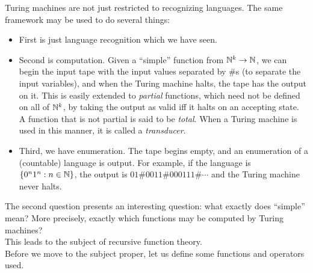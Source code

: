 	Turing machines are not just restricted to recognizing languages. The same framework may be used to do several things:
	\begin{itemize}
		\item First is just language recognition which we have seen.
		\item Second is computation. Given a ``simple'' function from $\mathbb{N}^k \to \mathbb{N}$, we can begin the input tape with the input values separated by $\#$s (to separate the input variables), and when the Turing machine halts, the tape has the output on it. This is easily extended to \emph{partial} functions, which need not be defined on all of $\mathbb{N}^k$, by taking the output as valid iff it halts on an accepting state. A function that is not partial is said to be \emph{total}. When a Turing machine is used in this manner, it is called a \emph{transducer}.
		\item Third, we have enumeration. The tape begins empty, and an enumeration of a (countable) language is output. For example, if the language is $\{0^n1^n : n \in \mathbb{N}\}$, the output is $01\#0011\#000111\#\cdots$ and the Turing machine never halts.
	\end{itemize}

	The second question presents an interesting question: what exactly does ``simple'' mean? More precisely, exactly which functions may be computed by Turing machines?\\

	This leads to the subject of recursive function theory.\\
	Before we move to the subject proper, let us define some functions and operators used.

